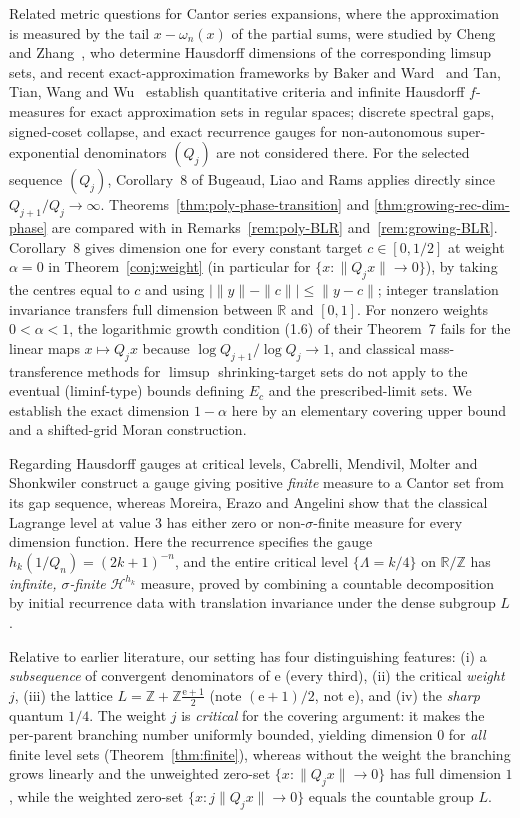 \documentclass[11pt]{article}
\theoremstyle{definition}
\theoremstyle{remark}
\newcommand{\R}{\mathbb{R}}
\newcommand{\Z}{\mathbb{Z}}
\newcommand{\ee}{\mathrm{e}}
\newcommand{\Lam}{\Lambda}
\begin{document}
Related metric questions for Cantor series expansions, where the approximation
is measured by the tail $x-\omega_n(x)$ of the partial sums, were studied by
Cheng and Zhang~\cite{CZ}, who determine Hausdorff dimensions of the
corresponding limsup sets, and recent exact-approximation frameworks by Baker
and Ward~\cite{BW2025} and Tan, Tian, Wang and Wu~\cite{TTWW2026} establish
quantitative criteria and infinite Hausdorff $f$-measures for exact
approximation sets in regular spaces; discrete spectral gaps, signed-coset
collapse, and exact recurrence gauges for non-autonomous super-exponential
denominators $(Q_j)$ are not considered there.
For the selected sequence $(Q_j)$, Corollary~8 of Bugeaud, Liao and Rams
\cite{BLR} applies directly since $Q_{j+1}/Q_j\to\infty$. Theorems~\ref{thm:poly-phase-transition} and
\ref{thm:growing-rec-dim-phase} are compared with \cite{BLR} in
Remarks~\ref{rem:poly-BLR} and~\ref{rem:growing-BLR}. Corollary~8 gives dimension
one for every constant target $c\in[0,1/2]$ at weight $\alpha=0$ in
Theorem~\ref{conj:weight} (in particular for $\{x:\|Q_jx\|\to0\}$), by taking
the centres equal to $c$ and using $|\|y\|-\|c\||\le\|y-c\|$; integer
translation invariance transfers full dimension between $\R$ and $[0,1]$. For
nonzero weights $0<\alpha<1$, the logarithmic growth condition (1.6) of their
Theorem~7 fails for the linear maps $x\mapsto Q_jx$ because
$\log Q_{j+1}/\log Q_j\to1$, and classical mass-transference methods for
$\limsup$ shrinking-target sets \cite{BV} do not apply to the eventual
(liminf-type) bounds defining $E_c$ and the prescribed-limit sets. We establish
the exact dimension $1-\alpha$ here by an elementary covering upper bound and a
shifted-grid Moran construction.

Regarding Hausdorff gauges at critical levels, Cabrelli, Mendivil, Molter and
Shonkwiler \cite[\S5, Theorem~3]{CMMS} construct a gauge giving positive
\emph{finite} measure to a Cantor set from its gap sequence, whereas Moreira,
Erazo and Angelini \cite{MEA} show that the classical Lagrange level at value
$3$ has either zero or non-$\sigma$-finite measure for every dimension function.
Here the recurrence specifies the gauge $h_k(1/Q_n)=(2k+1)^{-n}$, and the entire
critical level $\{\Lam=k/4\}$ on $\R/\Z$ has \emph{infinite, $\sigma$-finite}
$\mathcal H^{h_k}$ measure, proved by combining a countable decomposition by
initial recurrence data with translation invariance under the dense subgroup
$L$.

Relative to earlier literature, our setting has four distinguishing features:
(i) a \emph{subsequence} of convergent denominators of $\ee$ (every third),
(ii) the critical \emph{weight} $j$, (iii) the lattice
$L=\Z+\Z\frac{\ee+1}{2}$ (note $(\ee+1)/2$, not $\ee$), and (iv) the
\emph{sharp} quantum $1/4$. The weight $j$ is \emph{critical} for the covering
argument: it makes the per-parent branching number uniformly bounded, yielding
dimension $0$ for \emph{all} finite level sets (Theorem~\ref{thm:finite}),
whereas without the weight the branching grows linearly and the unweighted
zero-set $\{x:\|Q_jx\|\to0\}$ has full dimension $1$, while the weighted
zero-set $\{x:j\|Q_jx\|\to0\}$ equals the countable group $L$.
\end{document}
